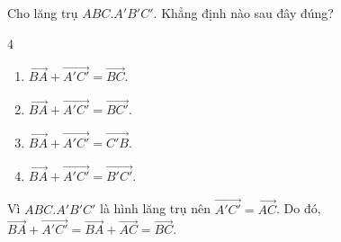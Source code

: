 \begin{baitap}
	Cho lăng trụ $ABC.A'B'C'$. Khẳng định nào sau đây đúng?
	\begin{multicols}{4}
		\begin{enumerate}
			\item $\overrightarrow{BA} + \overrightarrow{A'C'} = \overrightarrow{BC}$.
			\item $\overrightarrow{BA} + \overrightarrow{A'C'} = \overrightarrow{BC'}$.
			\item $\overrightarrow{BA} + \overrightarrow{A'C'} = \overrightarrow{C'B}$.
			\item $\overrightarrow{BA} + \overrightarrow{A'C'} = \overrightarrow{B'C'}$.
		\end{enumerate}
	\end{multicols}
	\begin{traloi}
		Vì $ABC.A'B'C'$ là hình lăng trụ nên $\overrightarrow{A'C'} = \overrightarrow{AC}$.
		Do đó, $\overrightarrow{BA} + \overrightarrow{A'C'} = \overrightarrow{BA} + \overrightarrow{AC} = \overrightarrow{BC}$.
	\end{traloi}
\end{baitap}

